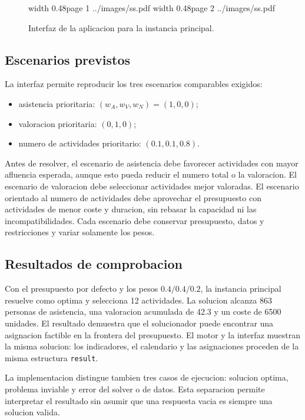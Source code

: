 \begin{figure}[h]
\begin{center}
\pdfximage width 0.48\textwidth page 1 {../images/ss.pdf}
\pdfrefximage\pdflastximage
\hfill
\pdfximage width 0.48\textwidth page 2 {../images/ss.pdf}
\pdfrefximage\pdflastximage
\end{center}
\caption{Interfaz de la aplicacion para la instancia principal.}
\end{figure}

\subsection{Escenarios previstos}

La interfaz permite reproducir los tres escenarios comparables exigidos:
\begin{itemize}
\item asistencia prioritaria: $(w_A,w_V,w_N)=(1,0,0)$;
\item valoracion prioritaria: $(0,1,0)$;
\item numero de actividades prioritario: $(0.1,0.1,0.8)$.
\end{itemize}

Antes de resolver, el escenario de asistencia debe favorecer actividades con mayor
afluencia esperada, aunque esto pueda reducir el numero total o la valoracion. El
escenario de valoracion debe seleccionar actividades mejor valoradas. El escenario
orientado al numero de actividades debe aprovechar el presupuesto con actividades
de menor coste y duracion, sin rebasar la capacidad ni las incompatibilidades.
Cada escenario debe conservar presupuesto, datos y restricciones y variar solamente
los pesos.

\subsection{Resultados de comprobacion}

Con el presupuesto por defecto y los pesos $0.4/0.4/0.2$, la instancia principal
resuelve como optima y selecciona 12 actividades. La solucion alcanza 863 personas
de asistencia, una valoracion acumulada de 42.3 y un coste de 6500 unidades. El
resultado demuestra que el solucionador puede encontrar una asignacion factible en
la frontera del presupuesto. El motor y la interfaz muestran la misma solucion:
los indicadores, el calendario y las asignaciones proceden de la misma estructura
\texttt{result}.

La implementacion distingue tambien tres casos de ejecucion: solucion optima,
problema inviable y error del solver o de datos. Esta separacion permite interpretar
el resultado sin asumir que una respuesta vacia es siempre una solucion valida.

